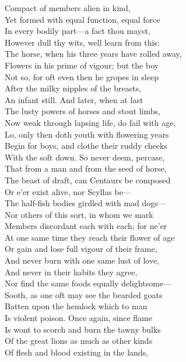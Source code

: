 Compact of members alien in kind,\\
Yet formed with equal function, equal force\\
In every bodily part—a fact thou mayst,\\
However dull thy wits, well learn from this:\\
The horse, when his three years have rolled away,\\
Flowers in his prime of vigour; but the boy\\
Not so, for oft even then he gropes in sleep\\
After the milky nipples of the breasts,\\
An infant still. And later, when at last\\
The lusty powers of horses and stout limbs,\\
Now weak through lapsing life, do fail with age,\\
Lo, only then doth youth with flowering years\\
Begin for boys, and clothe their ruddy cheeks\\
With the soft down. So never deem, percase,\\
That from a man and from the seed of horse,\\
The beast of draft, can Centaurs be composed\\
Or e'er exist alive, nor Scyllas be—\\
The half-fish bodies girdled with mad dogs—\\
Nor others of this sort, in whom we mark\\
Members discordant each with each; for ne'er\\
At one same time they reach their flower of age\\
Or gain and lose full vigour of their frame,\\
And never burn with one same lust of love,\\
And never in their habits they agree,\\
Nor find the same foods equally delightsome—\\
Sooth, as one oft may see the bearded goats\\
Batten upon the hemlock which to man\\
Is violent poison. Once again, since flame\\
Is wont to scorch and burn the tawny bulks\\
Of the great lions as much as other kinds\\
Of flesh and blood existing in the lands,\\

